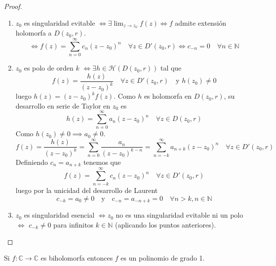 \begin{proof}
    \leavevmode
    \begin{enumerate}
        \item $z_0$ es singularidad evitable $\iff \exists \lim_{z \to z_0} f(z) \iff f$ admite extensión holomorfa a $D(z_0, r)$.\\
        \[
            \iff f(z) = \sum_{n=0}^{\infty} c_n (z - z_0)^n \quad \forall z \in D'(z_0, r)  \iff c_{-n} = 0 \quad \forall n \in \mathbb{N}
        \]
        \item $z_0$ es polo de orden $k$ $\iff \exists h \in \mathcal{H}(D(z_0, r))$ tal que 
        \[
            f(z) = \frac{h(z)}{(z - z_0)^k} \quad \forall z \in D'(z_0, r) \quad \text{y } h(z_0) \neq 0
        \]
        luego $h(z) = (z - z_0)^k f(z)$. Como $h$ es holomorfa en $D(z_0, r)$, su desarrollo en serie de Taylor en $z_0$ es
        \[
            h(z) = \sum_{n=0}^{\infty} a_n (z - z_0)^n \quad \forall z \in D(z_0, r)
        \]
        Como $h(z_0) \neq 0 \implies a_0 \neq 0$. 
        \[
            f(z) = \frac{h(z)}{(z - z_0)^k} = \sum_{n=0}^{\infty} \frac{a_n}{(z - z_0)^{k-n}} = \sum_{n=-k}^{\infty} a_{n+k} (z - z_0)^n \quad \forall z \in D'(z_0, r)
        \]
        Definiendo $c_n = a_{n+k}$ tenemos que
        \[
            f(z) = \sum_{n=-k}^{\infty} c_n (z - z_0)^n \quad \forall z \in D'(z_0, r)
        \]
        luego por la unicidad del desarrollo de Laurent
        \[
            c_{-k} = a_0 \neq 0 \quad \text{y} \quad c_{-n} = a_{-n+k} = 0 \quad \forall n > k, n \in \mathbb{N}
        \]
        \item $z_0$ es singularidad esencial $\iff z_0$ no es una singularidad evitable ni un polo $\iff$ $c_{-k} \neq 0$ para infinitos $k \in \mathbb{N}$ (aplicando los puntos anteriores).
    \end{enumerate}
\end{proof}


\begin{proposición}
    Si $f: \mathbb{C} \to \mathbb{C}$ es biholomorfa entonces $f$ es un polinomio de grado 1.
\end{proposición}

